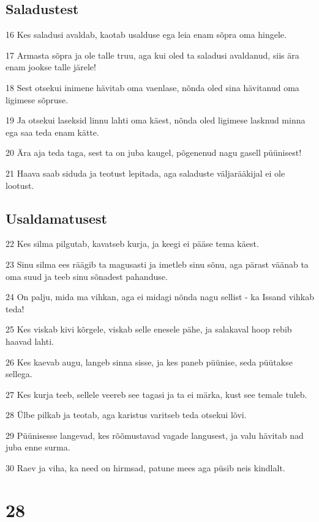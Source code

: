 \section*{Saladustest}

\par 16 Kes saladusi avaldab, kaotab usalduse ega leia enam sõpra oma hingele.
\par 17 Armasta sõpra ja ole talle truu, aga kui oled ta saladusi avaldanud, siis ära enam jookse talle järele!
\par 18 Sest otsekui inimene hävitab oma vaenlase, nõnda oled sina hävitanud oma ligimese sõpruse.
\par 19 Ja otsekui laseksid linnu lahti oma käest, nõnda oled ligimese lasknud minna ega saa teda enam kätte.
\par 20 Ära aja teda taga, sest ta on juba kaugel, põgenenud nagu gasell püünisest!
\par 21 Haava saab siduda ja teotust lepitada, aga saladuste väljarääkijal ei ole lootust.

\section*{Usaldamatusest}

\par 22 Kes silma pilgutab, kavatseb kurja, ja keegi ei pääse tema käest.
\par 23 Sinu silma ees räägib ta magusasti ja imetleb sinu sõnu, aga pärast väänab ta oma suud ja teeb sinu sõnadest pahanduse.
\par 24 On palju, mida ma vihkan, aga ei midagi nõnda nagu sellist - ka Issand vihkab teda!
\par 25 Kes viskab kivi kõrgele, viskab selle enesele pähe, ja salakaval hoop rebib haavad lahti.
\par 26 Kes kaevab augu, langeb sinna sisse, ja kes paneb püünise, seda püütakse sellega.
\par 27 Kes kurja teeb, sellele veereb see tagasi ja ta ei märka, kust see temale tuleb.
\par 28 Ülbe pilkab ja teotab, aga karistus varitseb teda otsekui lõvi.
\par 29 Püünisesse langevad, kes rõõmustavad vagade langusest, ja valu hävitab nad juba enne surma.
\par 30 Raev ja viha, ka need on hirmsad, patune mees aga püsib neis kindlalt.

\chapter{28}

